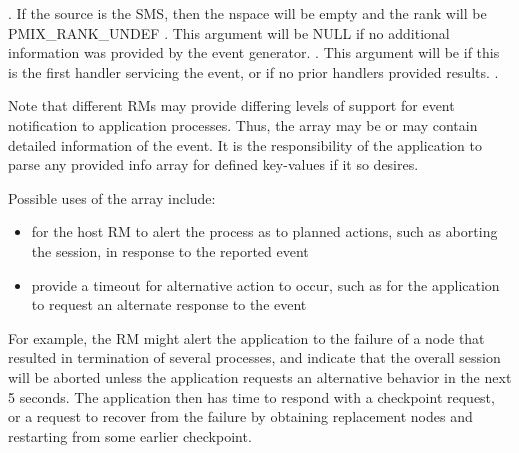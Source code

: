 \begin{arglist}
. If the source is the \ac{SMS}, then the nspace will be empty and the rank will be PMIX_RANK_UNDEF
. This argument will be NULL if no additional information was provided by the event generator.
. This argument will be  if this is the first handler servicing the event, or if no prior handlers provided results.
.
\end{arglist}

\descr

Note that different \acp{RM} may provide differing levels of support for event notification to application processes. Thus, the  array may be  or may contain detailed information of the event. It is the responsibility of the application to parse any provided info array for defined key-values if it so desires.

\adviceuserstart
Possible uses of the  array include:

\begin{itemize}
%
\item for the host \ac{RM} to alert the process as to planned actions, such as aborting the session, in response to the reported event
%
\item provide a timeout for alternative action to occur, such as for the application to request an alternate response to the event
%
\end{itemize}

For example, the \ac{RM} might alert the application to the failure of a node that resulted in termination of several processes, and indicate that the overall session will be aborted unless the application requests an alternative behavior in the next 5 seconds. The application then has time to respond with a checkpoint request, or a request to recover from the failure by obtaining replacement nodes and restarting from some earlier checkpoint.

